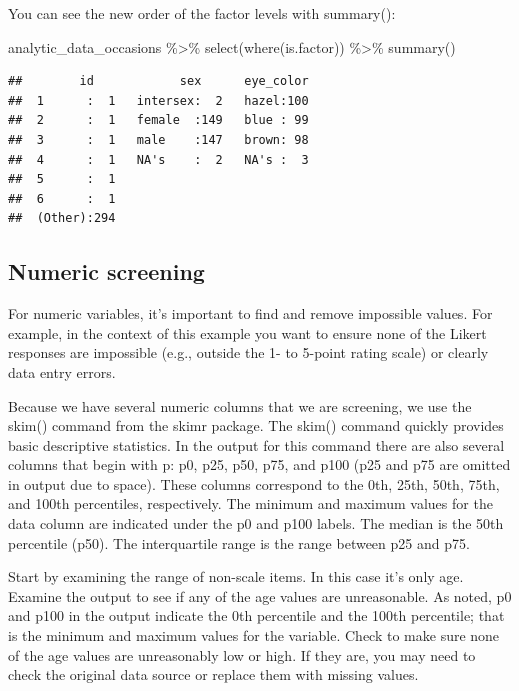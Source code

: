 \documentclass[
]{krantz}
\makeatletter
\newenvironment{Shaded}{\begin{snugshade}}{\end{snugshade}}
\newcommand{\FunctionTok}[1]{\textcolor[rgb]{0,0,0}{#1}}
\newcommand{\NormalTok}[1]{#1}
\newcommand{\SpecialCharTok}[1]{\textcolor[rgb]{0,0,0}{#1}}
\newenvironment{kframe}{%
\medskip{}
\setlength{\fboxsep}{.8em}
 \def\at@end@of@kframe{}%
 \ifinner\ifhmode%
  \def\at@end@of@kframe{\end{minipage}}%
  \begin{minipage}{\columnwidth}%
 \fi\fi%
 \def\FrameCommand##1{\hskip\@totalleftmargin \hskip-\fboxsep
 \colorbox{shadecolor}{##1}\hskip-\fboxsep
     \hskip-\linewidth \hskip-\@totalleftmargin \hskip\columnwidth}%
 \MakeFramed {\advance\hsize-\width
   \@totalleftmargin\z@ \linewidth\hsize
   \@setminipage}}%
 {\par\unskip\endMakeFramed%
 \at@end@of@kframe}
\renewenvironment{Shaded}{\begin{kframe}}{\end{kframe}}
\makeatother
\begin{document}
You can see the new order of the factor levels with summary():

\begin{Shaded}
\begin{Highlighting}[]
\NormalTok{analytic\_data\_occasions }\SpecialCharTok{\%\textgreater{}\%}
  \FunctionTok{select}\NormalTok{(}\FunctionTok{where}\NormalTok{(is.factor)) }\SpecialCharTok{\%\textgreater{}\%}
  \FunctionTok{summary}\NormalTok{()}
\end{Highlighting}
\end{Shaded}

\begin{verbatim}
##        id            sex      eye_color  
##  1      :  1   intersex:  2   hazel:100  
##  2      :  1   female  :149   blue : 99  
##  3      :  1   male    :147   brown: 98  
##  4      :  1   NA's    :  2   NA's :  3  
##  5      :  1                             
##  6      :  1                             
##  (Other):294
\end{verbatim}

\hypertarget{numeric-screening-4}{%
\subsection{Numeric screening}\label{numeric-screening-4}}

For numeric variables, it's important to find and remove impossible values. For example, in the context of this example you want to ensure none of the Likert responses are impossible (e.g., outside the 1- to 5-point rating scale) or clearly data entry errors.

Because we have several numeric columns that we are screening, we use the skim() command from the skimr package. The skim() command quickly provides basic descriptive statistics. In the output for this command there are also several columns that begin with p: p0, p25, p50, p75, and p100 (p25 and p75 are omitted in output due to space). These columns correspond to the 0th, 25th, 50th, 75th, and 100th percentiles, respectively. The minimum and maximum values for the data column are indicated under the p0 and p100 labels. The median is the 50th percentile (p50). The interquartile range is the range between p25 and p75.

Start by examining the range of non-scale items. In this case it's only age. Examine the output to see if any of the age values are unreasonable. As noted, p0 and p100 in the output indicate the 0th percentile and the 100th percentile; that is the minimum and maximum values for the variable. Check to make sure none of the age values are unreasonably low or high. If they are, you may need to check the original data source or replace them with missing values.
\end{document}
